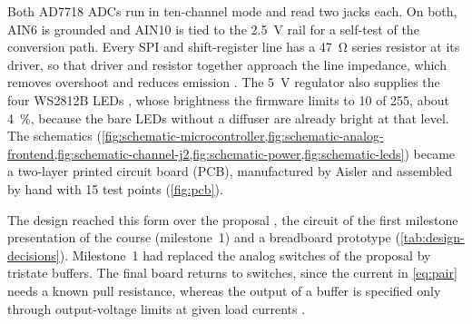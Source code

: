 Both AD7718 ADCs \cite{adi2001ad7718} run in ten-channel mode and read two jacks each. On both, AIN6 is grounded and AIN10 is tied to the \qty{2.5}{\volt} rail for a self-test of the conversion path. Every SPI and shift-register line has a \qty{47}{\ohm} series resistor at its driver, so that driver and resistor together approach the line impedance, which removes overshoot and reduces emission \cite{ti1998scaa031}. The \qty{5}{\volt} regulator also supplies the four WS2812B LEDs \cite{worldsemi2026ws2812b}, whose brightness the firmware limits to 10 of 255, about \qty{4}{\percent}, because the bare LEDs without a diffuser are already bright at that level. The schematics (\cref{fig:schematic-microcontroller,fig:schematic-analog-frontend,fig:schematic-channel-j2,fig:schematic-power,fig:schematic-leds}) became a two-layer printed circuit board (PCB), manufactured by Aisler and assembled by hand with 15 test points (\cref{fig:pcb}).

The design reached this form over the proposal \cite{benson2026proposal}, the circuit of the first milestone presentation of the course (milestone~1) and a breadboard prototype (\cref{tab:design-decisions}). Milestone~1 had replaced the analog switches of the proposal by tristate buffers. The final board returns to switches, since the current in \cref{eq:pair} needs a known pull resistance, whereas the output of a buffer is specified only through output-voltage limits at given load currents \cite{ti2026sn74lvc126a}.

